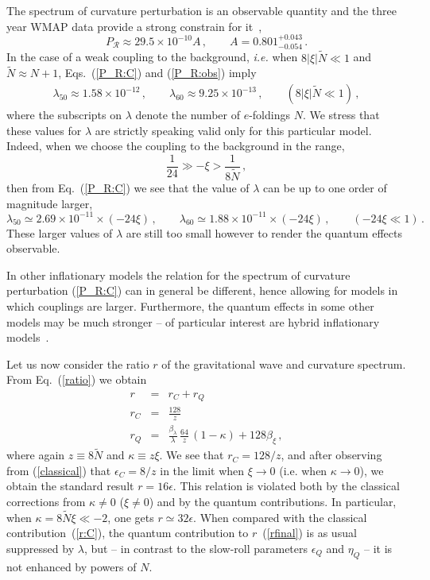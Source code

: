 \documentclass[aps,12pt,superscriptaddress,preprintnumbers,
                secnumarabic,nofootinbib,showpacs]{revtex4}
\begin{document}
 The spectrum of curvature perturbation is an observable quantity and
the three year WMAP data provide a strong
constrain for it~\cite{Spergel:2006},
\begin{equation}
P_{\mathcal{R}} \approx 29.5\times 10^{-10}A\,,
\label{P_R:obs}
\qquad
A = 0.801^{+0.043}_{-0.054}
\,.
\end{equation}
In the case of a weak coupling to the background,
{\it i.e.} when $8|\xi|\tilde{N}\ll 1$ and $\tilde{N}\approx N+1$,
Eqs.~(\ref{P_R:C}) and (\ref{P_R:obs}) imply
\begin{eqnarray}
\lambda_{50} \approx 1.58\times 10^{-12}\,,\qquad
\lambda_{60} \approx 9.25\times 10^{-13}\,,
\qquad (8|\xi|\tilde{N}\ll 1)
\,,
\end{eqnarray}
where the subscripts on $\lambda$ denote the number of $e$-foldings $N$.
We stress that these values for $\lambda$ are strictly speaking valid only
for this particular model. Indeed, when we choose the coupling to the
background in the range,
\begin{equation}
\frac{1}{24}\gg - \xi > \frac{1}{8\tilde{N}}
\,,
\label{condition:final:2}
\end{equation}
then from Eq.~(\ref{P_R:C}) we see that the value of
$\lambda$ can be up to one order of magnitude larger,
\begin{equation}
  \lambda_{50}\simeq 2.69\times 10^{-11}\times (-24 \xi)
\,,\qquad
  \lambda_{60}\simeq 1.88\times 10^{-11}\times (-24 \xi)
\,,\qquad
(-24 \xi\ll 1)
\,.
\label{lambda50+60:2}
\end{equation}
These larger values of $\lambda$ are still too small
however to render the quantum effects observable.

In other inflationary models the relation for
the spectrum of curvature perturbation
(\ref{P_R:C}) can in general be different, hence allowing for models in
which couplings are larger. Furthermore, the quantum effects in some other
models may be much stronger -- of particular interest are hybrid
inflationary models~\cite{ProkopecBilandzic}.

 Let us now consider the ratio $r$ of the gravitational wave and
curvature spectrum. From Eq.~(\ref{ratio}) we obtain
\begin{eqnarray}
r &=& r_C + r_Q
\nonumber\\
r_C &=& \frac{128}{z}
\label{r:C}
\\
r_Q &=& \frac{\beta_{\lambda}}{\lambda}\,\frac{64}{z}\,(1-\kappa) +
       128\beta_{\xi}
\,,
\label{rfinal}
\end{eqnarray}
where again $z\equiv 8\tilde{N}$ and  $\kappa\equiv z\xi$. We see
that $r_C = {128}/{z}$, and after observing from
(\ref{classical}) that $\epsilon_C = {8}/{z}$ in the limit
when $\xi\rightarrow 0$ (i.e. when $\kappa\rightarrow 0$), we
obtain the standard result $r=16\epsilon$.
This relation is violated both by the classical corrections
from  $\kappa\neq 0$ ($\xi\neq 0$) and by the quantum contributions.
In particular, when $\kappa= 8\tilde{N}\xi \ll -2$, one gets
$r\simeq 32\epsilon$. When compared with the classical
contribution~(\ref{r:C}), the quantum contribution to
 $r$~(\ref{rfinal}) is as usual suppressed
by $\lambda$, but --  in contrast to the slow-roll
 parameters $\epsilon_Q$ and $\eta_Q$ --
 it is not enhanced by powers of $N$.
\end{document}

